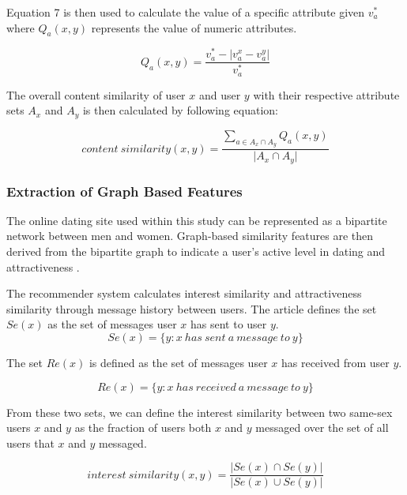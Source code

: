 \documentclass[11pt]{article}
\begin{document}
Equation 7 is then used to calculate the value of a specific attribute given $v_a^*$ where $Q_a(x,y)$ represents the value of numeric attributes.

\begin{equation}
    Q_a(x,y)= \frac{v_a^* - \lvert v_a^x-v_a^y\rvert}{v_a^*}
\end{equation}

The overall content similarity of user $x$ and user $y$ with their respective attribute sets $A_x$ and $A_y$ is then calculated by following equation:

\begin{equation}
content\ similarity(x,y) = \frac{\sum_{a \in A_x \cap A_y}Q_a(x,y)}{\lvert A_x \cap A_y \rvert}
\end{equation}

\subsubsection{Extraction of Graph Based Features}
The online dating site used within this study can be represented as a bipartite network between men and women. Graph-based similarity features are then derived from the bipartite graph to indicate a user's active level in dating and attractiveness \cite{recip}. 

\indent The recommender system calculates interest similarity and attractiveness similarity through message history between users. The article defines the set $Se(x)$ as the set of messages user $x$ has sent to user $y$. 
\begin{equation}
    Se(x) = \{y: x\ has\ sent\ a\ message\ to\ y\}
\end{equation}

The set $Re(x)$ is defined as the set of messages user $x$ has received from user $y$.

\begin{equation}
    Re(x) = \{y: x\ has\ received\ a\ message\ to\ y\}
\end{equation}

From these two sets, we can define the interest similarity between two same-sex users $x$ and $y$ as the fraction of users both $x$ and $y$ messaged over the set of all users that $x$ and $y$ messaged.

\begin{equation}
    interest\ similarity(x,y) = \frac{\lvert Se(x) \cap Se(y) \rvert}{\lvert Se(x) \cup Se(y) \rvert}
\end{equation}
\end{document}

